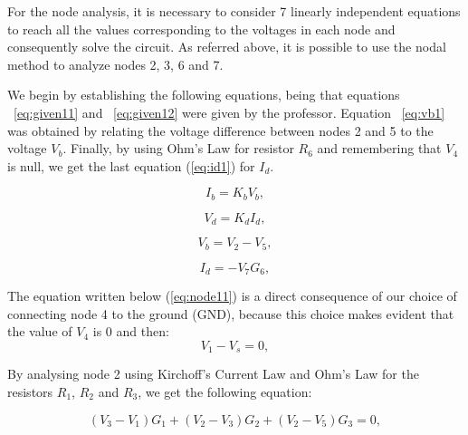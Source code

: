 For the node analysis, it is necessary to consider 7 linearly independent equations to reach all the values corresponding to the voltages in each node and consequently solve the circuit. As referred above, it is possible to use the nodal method to analyze nodes 2, 3, 6 and 7.

We begin by establishing the following equations, being that equations ~\ref{eq:given11} and ~\ref{eq:given12} were given by the professor. Equation ~\ref{eq:vb1} was obtained by relating the voltage difference between nodes 2 and 5 to the voltage $V_b$. Finally, by using Ohm's Law for resistor $R_6$ and remembering that $V_4$ is null, we get the last equation (\ref{eq:id1}) for $I_d$.

\begin{equation}
  I_{b} = K_{b}V_{b} ,
  \label{eq:given11}
\end{equation}

\begin{equation}
  V_{d} = K_{d}I_{d} ,
  \label{eq:given12}
\end{equation}

\begin{equation}
  V_{b} = V_{2} - V_{5} ,
  \label{eq:vb1}
\end{equation}

\begin{equation}
  I_{d} = -V_{7}G_{6} ,
  \label{eq:id1}
\end{equation}

The equation written below (\ref{eq:node11}) is a direct consequence of our choice of connecting node 4 to the ground (GND), because this choice makes evident that the value of $V_4$ is 0 and then:
\begin{equation}
  V_{1} - V_{s} = 0,
  \label{eq:node11}
\end{equation}


By analysing node 2 using Kirchoff's Current Law and Ohm's Law for the resistors $R_1$, $R_2$ and $R_3$, we get the following equation:

\begin{equation}
  (V_{3} - V_{1})G_{1} + (V_{2} - V_{3})G_{2} + (V_{2} - V_{5})G_{3}= 0,
  \label{eq:node12}
\end{equation}


